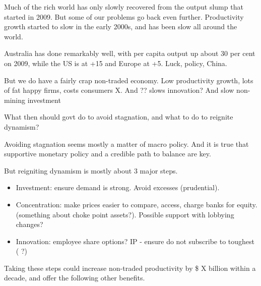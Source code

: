 
\begin{overview}[-1pt] %
Much of the rich world has only slowly recovered from the output slump that started in 2009. But some of our problems go back even further. Productivity growth started to slow in the early 2000s, and has been slow all around the world. 

Australia has done remarkably well, with per capita output up about 30 per cent on 2009, while the US is at +15 and Europe at +5. Luck, policy, China. 

But we do have a fairly crap non-traded economy. Low productivity growth, lots of fat happy firms, costs consumers X. And ?? slows innovation? And slow non-mining investment

What then should govt do to avoid stagnation, and what to do to reignite dynamism?

Avoiding stagnation seems mostly a matter of macro policy. And it is true that supportive monetary policy and a credible path to balance are key. 

But reigniting dynamism is mostly about 3 major steps. 

\begin{itemize}
    \item Investment: ensure demand is strong. Avoid excesses (prudential). 
    \item Concentration: make prices easier to compare, access, charge banks for equity. (something about choke point assets?). Possible support with lobbying changes? 
    \item Innovation: employee share options? IP - ensure do not subscribe to toughest ( ?)
\end{itemize}

Taking these steps could increase non-traded productivity by \$ X billion within a decade, and offer the following other benefits.  

\end{overview}